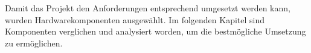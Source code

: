 \label{Hardwarekomponenten}

Damit das Projekt den Anforderungen entsprechend umgesetzt werden kann, wurden Hardwarekomponenten ausgewählt. Im folgenden Kapitel sind Komponenten verglichen und analysiert worden, um die bestmögliche Umsetzung zu ermöglichen.